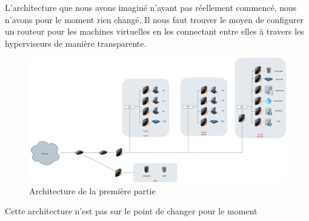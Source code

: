 \documentclass[../file.tex]{subfiles}
\begin{document}
	
L'architecture que nous avons imaginé n'ayant pas réellement commencé, nous n'avons pour le moment 
rien changé. Il nous faut trouver le moyen de configurer un routeur pour les machines virtuelles en les connectant 
entre elles à travers les hyperviseurs de manière transparente.

\begin{figure}[h]
    \centering
    \includegraphics[width=1\textwidth]{../Images/Architecture.jpg}
    \caption{Architecture de la première partie}
    \label{fig:solution1}
\end{figure}

Cette architecture n'est pas sur le point de changer pour le moment
\end{document}
